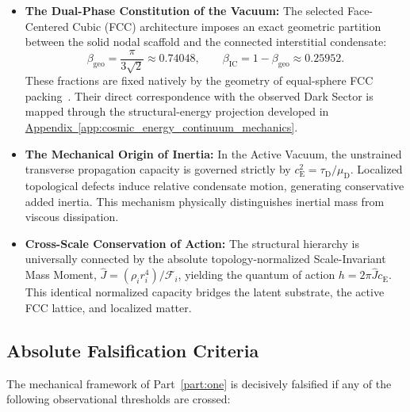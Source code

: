 \begin{itemize}
    \item \textbf{The Dual-Phase Constitution of the Vacuum:} The selected Face-Centered Cubic (FCC) architecture imposes an exact geometric partition between the solid nodal scaffold and the connected interstitial condensate:
    \[
        \beta_{\mathrm{geo}} = \frac{\pi}{3\sqrt{2}} \approx 0.74048, \qquad \beta_{\mathrm{IC}} = 1-\beta_{\mathrm{geo}} \approx 0.25952.
    \]
    These fractions are fixed natively by the geometry of equal-sphere FCC packing~\cite{Hales_2005}. Their direct correspondence with the observed Dark Sector is mapped through the structural-energy projection developed in \hyperref[app:cosmic_energy_continuum_mechanics]{Appendix~\ref*{app:cosmic_energy_continuum_mechanics}}.

    \item \textbf{The Mechanical Origin of Inertia:} In the Active Vacuum, the unstrained transverse propagation capacity is governed strictly by $c_{\mathrm E}^{2} = \tau_{\mathrm D}/\mu_{\mathrm D}$. Localized topological defects induce relative condensate motion, generating conservative added inertia. This mechanism physically distinguishes inertial mass from viscous dissipation.

    \item \textbf{Cross-Scale Conservation of Action:} The structural hierarchy is universally connected by the absolute topology-normalized Scale-Invariant Mass Moment, $\hat{J} = (\rho_i r_i^{4})/\mathcal{F}_i$, yielding the quantum of action $h=2\pi\hat{J}c_{\mathrm E}$. This identical normalized capacity bridges the latent substrate, the active FCC lattice, and localized matter.
\end{itemize}

\subsection*{Absolute Falsification Criteria}

The mechanical framework of Part~\ref{part:one} is decisively falsified if any of the following observational thresholds are crossed:

